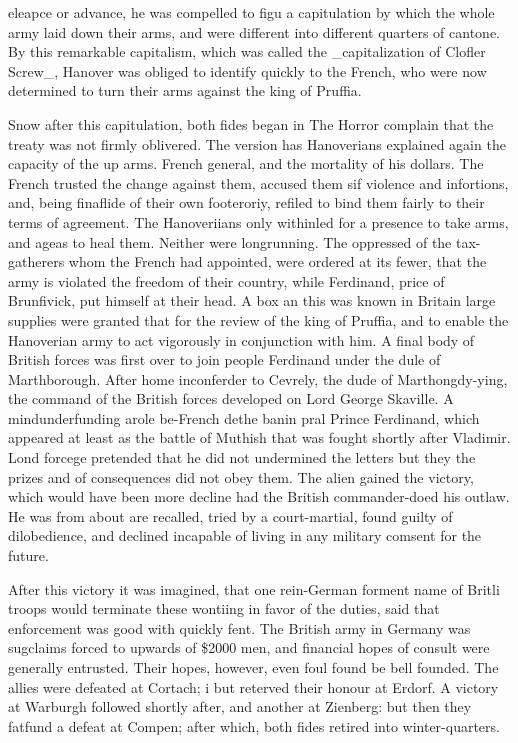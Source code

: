 \documentclass[10pt]{article}
\begin{document}
eleapce or advance, he was compelled to figu a capitulation by which the whole army laid down their arms, and were different into different quarters of cantone. By this remarkable capitalism, which was called the \_capitalization of Clofler Screw\_, Hanover was obliged to identify quickly to the French, who were now determined to turn their arms against the king of Pruffia.

Snow after this capitulation, both fides began in The Horror complain that the treaty was not firmly oblivered. The version has Hanoverians explained again the capacity of the up arms. French general, and the mortality of his dollars. The French trusted the change against them, accused them sif violence and infortions, and, being finaflide of their own footeroriy, refiled to bind them fairly to their terms of agreement. The Hanoveriians only withinled for a presence to take arms, and ageas to heal them. Neither were longrunning. The oppressed of the tax-gatherers whom the French had appointed, were ordered at its fewer, that the army is violated the freedom of their country, while Ferdinand, price of Brunfivick, put himself at their head. A box an this was known in Britain large supplies were granted that for the review of the king of Pruffia, and to enable the Hanoverian army to act vigorously in conjunction with him. A final body of British forces was first over to join people Ferdinand under the dule of Marthborough. After home inconferder to Cevrely, the dude of Marthongdy-ying, the command of the British forces developed on Lord George Skaville. A mindunderfunding arole be-French dethe banin pral Prince Ferdinand, which appeared at least as the battle of Muthish that was fought shortly after Vladimir. Lond forcege pretended that he did not undermined the letters but they the prizes and of consequences did not obey them. The alien gained the victory, which would have been more decline had the British commander-doed his outlaw. He was from about are recalled, tried by a court-martial, found guilty of dilobedience, and declined incapable of living in any military comsent for the future.

After this victory it was imagined, that one rein-German forment name of Britli troops would terminate these wontiing in favor of the duties, said that enforcement was good with quickly fent. The British army in Germany was sugclaims forced to upwards of \$2000 men, and financial hopes of consult were generally entrusted. Their hopes, however, even foul found be bell founded. The allies were defeated at Cortach; i but reterved their honour at Erdorf. A victory at Warburgh followed shortly after, and another at Zienberg: but then they fatfund a defeat at Compen; after which, both fides retired into winter-quarters.
\end{document}
